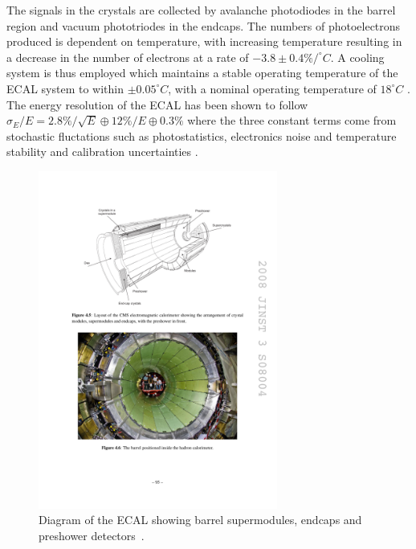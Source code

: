 The signals in the crystals are collected by avalanche photodiodes in the barrel region and vacuum
phototriodes in the endcaps. The numbers of photoelectrons produced is dependent on temperature, with
increasing temperature resulting in a decrease in the number of electrons at a rate of
$-3.8\pm0.4\%/^{\circ}C$. A cooling system is thus employed which maintains a stable operating temperature of
the ECAL system to within $\pm0.05^{\circ}C$, with a nominal operating temperature of $18^{\circ}C$
\cite{CMS_experiment}. The energy resolution of the ECAL has been shown to follow $\sigma_{E}/E =
2.8\%/\sqrt{E}\oplus 12\%/E \oplus 0.3\%$ where the three constant terms come from stochastic fluctations such
as photostatistics, electronics noise and temperature stability and calibration uncertainties
\cite{ECAL_calibration_and_resolution_at_7TeV}.

\begin{figure}[hbtp]
   \centering
     \includegraphics[width=0.7\textwidth]{Chapters/02_Detector/Images/ECAL.pdf}\hfill
     \caption[Diagram of the ECAL showing barrel supermodules, endcaps and preshower detectors.]{Diagram of
     the ECAL showing barrel supermodules, endcaps and preshower
     detectors~\cite{ECAL_calibration_and_resolution_at_7TeV}.}
     \label{fig:CMS_ECAL}
\end{figure}

